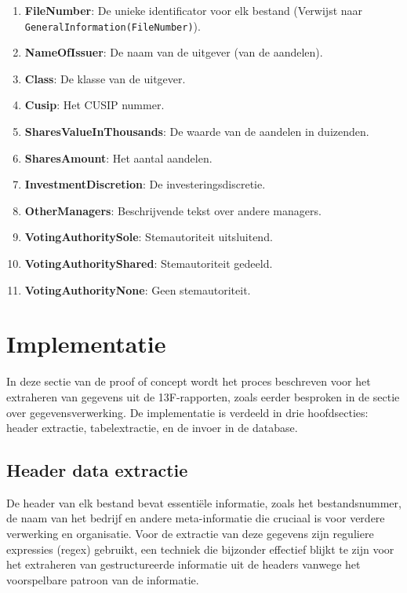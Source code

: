 \begin{enumerate}
    \item \textbf{FileNumber}: De unieke identificator voor elk bestand (Verwijst naar \texttt{GeneralInformation(FileNumber)}).
    \item \textbf{NameOfIssuer}: De naam van de uitgever (van de aandelen).
    \item \textbf{Class}: De klasse van de uitgever.
    \item \textbf{Cusip}: Het CUSIP nummer.
    \item \textbf{SharesValueInThousands}: De waarde van de aandelen in duizenden.
    \item \textbf{SharesAmount}: Het aantal aandelen.
    \item \textbf{InvestmentDiscretion}: De investeringsdiscretie.
    \item \textbf{OtherManagers}: Beschrijvende tekst over andere managers.
    \item \textbf{VotingAuthoritySole}: Stemautoriteit uitsluitend.
    \item \textbf{VotingAuthorityShared}: Stemautoriteit gedeeld.
    \item \textbf{VotingAuthorityNone}: Geen stemautoriteit.
\end{enumerate}

\section{Implementatie}
In deze sectie van de proof of concept wordt het proces beschreven voor het extraheren van gegevens uit de 13F-rapporten, zoals eerder besproken in de sectie over gegevensverwerking. De implementatie is verdeeld in drie hoofdsecties: header extractie, tabelextractie, en de invoer in de database.



\subsection{Header data extractie}
De header van elk bestand bevat essentiële informatie, zoals het bestandsnummer, de naam van het bedrijf en andere meta-informatie die cruciaal is voor verdere verwerking en organisatie. Voor de extractie van deze gegevens zijn reguliere expressies (regex) gebruikt, een techniek die bijzonder effectief blijkt te zijn voor het extraheren van gestructureerde informatie uit de headers vanwege het voorspelbare patroon van de informatie.



